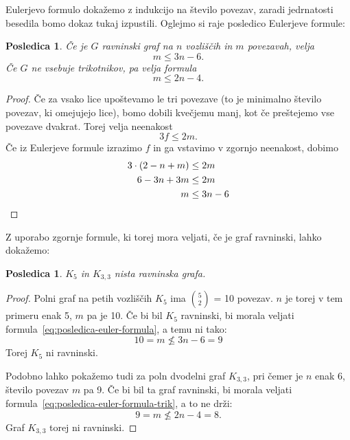 \documentclass[12pt,a4paper]{amsart}
\theoremstyle{definition} %
\theoremstyle{plain} %
\newtheorem{posledica}[definicija]{Posledica}
\begin{document}
Eulerjevo formulo dokažemo z indukcijo na število povezav, zaradi jedrnatosti besedila bomo dokaz tukaj izpustili. Oglejmo si raje posledico Eulerjeve formule:

\begin{posledica}
    Če je $G$ ravninski graf na $n$ vozliščih in $m$ povezavah, velja
    \begin{equation} 
    \label{eq:posledica-euler-formula}
    m \leq 3n - 6.
    \end{equation}
    Če $G$ ne vsebuje trikotnikov, pa velja formula
    \begin{equation} 
    \label{eq:posledica-euler-formula-trik}
    m \leq 2n - 4.
    \end{equation}
\end{posledica}

\begin{proof}
    Če za vsako lice upoštevamo le tri povezave (to je minimalno število povezav, ki omejujejo lice), bomo dobili kvečjemu manj, kot če preštejemo vse povezave dvakrat. Torej velja neenakost
    \[ 3f \leq 2m .\]
    Če iz Eulerjeve formule izrazimo $f$ in ga vstavimo v zgornjo neenakost, dobimo
    \begin{align*}
        3\cdot(2-n+m) &\leq 2m \\
        6 - 3n + 3m &\leq 2m \\
        m &\leq 3n - 6 \qedhere
    \end{align*}
\end{proof}

Z uporabo zgornje formule, ki torej mora veljati, če je graf ravninski, lahko dokažemo:
\begin{posledica}
    \label{posl:neravninska-grafa}
    $K_5$ in $K_{3,3}$ nista ravninska grafa.
\end{posledica}

\begin{proof}
    Polni graf na petih vozliščih $K_5$ ima {$5 \choose 2$} = 10 povezav. $n$ je torej v tem primeru enak
    5, $m$ pa je 10. Če bi bil $K_5$ ravninski, bi morala veljati formula~\ref{eq:posledica-euler-formula},
    a temu ni tako:
    \[ 10 = m \nleq 3n - 6 = 9 \]
    Torej $K_5$ ni ravninski.
    
    Podobno lahko pokažemo tudi za poln dvodelni graf $K_{3,3}$, pri čemer je $n$ enak 6, število povezav $m$ pa 9. Če bi bil ta graf ravninski, bi morala veljati formula~\ref{eq:posledica-euler-formula-trik}, a to ne drži:
    \[ 9 = m \nleq 2n - 4 = 8. \] 
    Graf $K_{3,3}$ torej ni ravninski. \qedhere
\end{proof}
\end{document}
